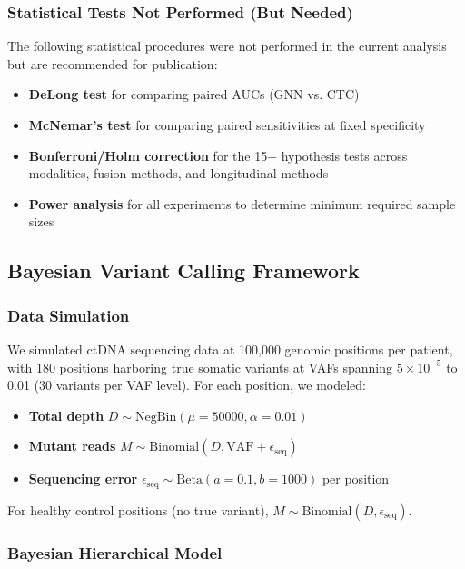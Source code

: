 \documentclass[10pt,a4paper]{article}
\begin{document}
\subsubsection{Statistical Tests Not Performed (But Needed)}

The following statistical procedures were not performed in the current analysis but are recommended for publication:

\begin{itemize}
\item \textbf{DeLong test} for comparing paired AUCs (GNN vs. CTC)
\item \textbf{McNemar's test} for comparing paired sensitivities at fixed specificity
\item \textbf{Bonferroni/Holm correction} for the 15+ hypothesis tests across modalities, fusion methods, and longitudinal methods
\item \textbf{Power analysis} for all experiments to determine minimum required sample sizes
\end{itemize}

\subsection{Bayesian Variant Calling Framework}

\subsubsection{Data Simulation}

We simulated ctDNA sequencing data at 100,000 genomic positions per patient, with 180 positions harboring true somatic variants at VAFs spanning $5 \times 10^{-5}$ to 0.01 (30 variants per VAF level). For each position, we modeled:

\begin{itemize}
\item \textbf{Total depth} $D \sim \text{NegBin}(\mu = 50000, \alpha = 0.01)$
\item \textbf{Mutant reads} $M \sim \text{Binomial}(D, \text{VAF} + \epsilon_{\text{seq}})$
\item \textbf{Sequencing error} $\epsilon_{\text{seq}} \sim \text{Beta}(a = 0.1, b = 1000)$ per position
\end{itemize}

For healthy control positions (no true variant), $M \sim \text{Binomial}(D, \epsilon_{\text{seq}})$.

\subsubsection{Bayesian Hierarchical Model}
\end{document}
